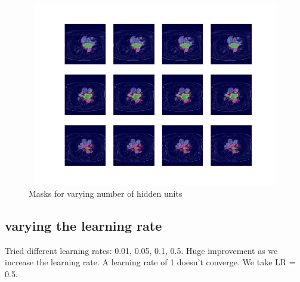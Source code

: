 \begin{figure}
\centering
\includegraphics[trim=2.5cm 1.5cm 2cm 1.5cm, clip=true, height=80mm, width=150mm]{Chapter3/mask_results_varying_number_of_hidden_units.png}
\caption{Masks for varying number of hidden units}
\end{figure}

\subsection{varying the learning rate}

\noindent Tried different learning rates: 0.01, 0.05, 0.1, 0.5. Huge improvement as we increase the learning rate. A learning rate of 1 doesn't converge. We take LR = 0.5.

